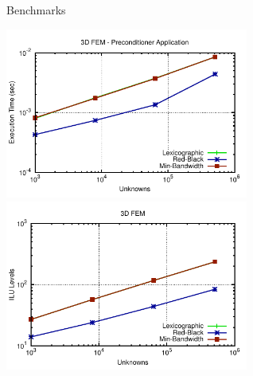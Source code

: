 \begin{frame}{Benchmarks}
  \begin{center}
   \vspace*{-0.4cm}
   \includegraphics[width=0.60\textwidth]{figures/fem3d-precond.pdf} \\[-0.2em]
   \includegraphics[width=0.60\textwidth]{figures/fem3d-levels.pdf}
  \end{center}
\end{frame}



